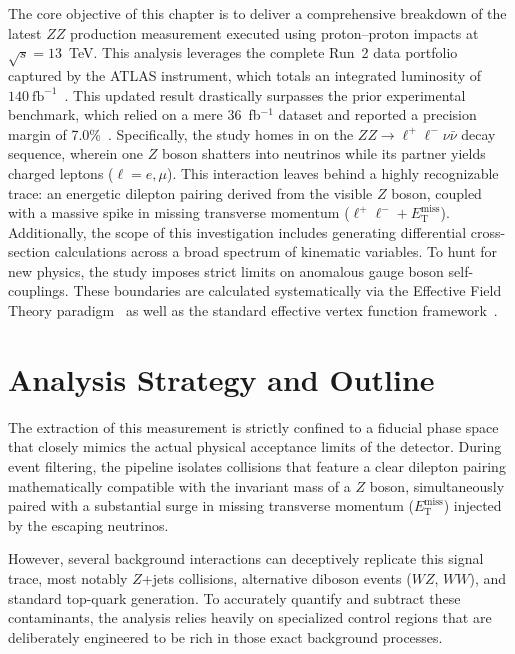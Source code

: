 The core objective of this chapter is to deliver a comprehensive breakdown of the latest $ZZ$ production measurement executed using proton–proton impacts at $\sqrt{s} = 13$~TeV. This analysis leverages the complete Run~2 data portfolio captured by the ATLAS instrument, which totals an integrated luminosity of $140~\text{fb}^{-1}$~\cite{ATLAS:2025_ZZ_llvv}. This updated result drastically surpasses the prior experimental benchmark, which relied on a mere 36~fb$^{-1}$ dataset and reported a precision margin of 7.0\%~\cite{ATLAS:2019zz_llvv}. Specifically, the study homes in on the $ZZ \rightarrow \ell^+\ell^- \nu \bar{\nu}$ decay sequence, wherein one $Z$ boson shatters into neutrinos while its partner yields charged leptons ($\ell = e, \mu$). This interaction leaves behind a highly recognizable trace: an energetic dilepton pairing derived from the visible $Z$ boson, coupled with a massive spike in missing transverse momentum ($\ell^+\ell^- + E_\text{T}^\text{miss}$). Additionally, the scope of this investigation includes generating differential cross-section calculations across a broad spectrum of kinematic variables. To hunt for new physics, the study imposes strict limits on anomalous gauge boson self-couplings. These boundaries are calculated systematically via the Effective Field Theory paradigm~\cite{Degrande:2013} as well as the standard effective vertex function framework~\cite{Hagiwara:1987}.

\section{Analysis Strategy and Outline}

The extraction of this measurement is strictly confined to a fiducial phase space that closely mimics the actual physical acceptance limits of the detector. During event filtering, the pipeline isolates collisions that feature a clear dilepton pairing mathematically compatible with the invariant mass of a $Z$ boson, simultaneously paired with a substantial surge in missing transverse momentum ($E_{\mathrm{T}}^{\text{miss}}$) injected by the escaping neutrinos.

However, several background interactions can deceptively replicate this signal trace, most notably $Z$+jets collisions, alternative diboson events ($WZ$, $WW$), and standard top-quark generation. To accurately quantify and subtract these contaminants, the analysis relies heavily on specialized control regions that are deliberately engineered to be rich in those exact background processes.


